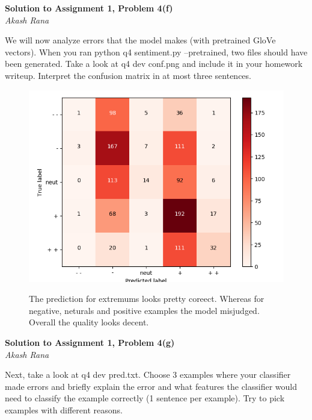 \documentclass[letter,12pt]{article}
\newcommand{\myhwtitle}[3]
{\begin{center}
{\large {\bf Solution to Assignment {#1}, Problem {#2}}}\\
\medskip
{\it {#3}} %
\end{center}}
\newcommand{\solutionsAuthor}{Akash Rana}
\begin{document}
\clearpage

\myhwtitle{1}{4(f)}{\solutionsAuthor}


\bigskip
\noindent We will now analyze errors that the model makes (with pretrained GloVe vectors). When you ran python q4 sentiment.py --pretrained, two files should have been generated. Take a look at q4 dev conf.png and include it in your homework writeup. Interpret the confusion matrix in at most three sentences.
\begin{figure}[!h!p]
\begin{center}
\includegraphics[scale=0.5]{../q4_dev_conf.png}
\end{center}
The prediction for extremums looks pretty coreect.  
 Whereas for negative, neturals and positive examples the model misjudged.
 Overall the quality looks decent.
\end{figure}

\clearpage

\myhwtitle{1}{4(g)}{\solutionsAuthor}


\bigskip
\noindent Next, take a look at q4 dev pred.txt. Choose 3 examples where your classifier made errors
and briefly explain the error and what features the classifier would need to classify the example correctly
(1 sentence per example). Try to pick examples with different reasons.
\end{document}
